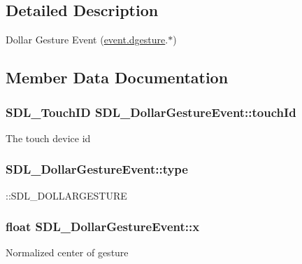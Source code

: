 \subsection{Detailed Description}
Dollar Gesture Event (\hyperlink{union_s_d_l___event_a4481167b9f8549aeb254e97ca812e74d}{event.\+dgesture}.$\ast$) 

\subsection{Member Data Documentation}
\hypertarget{struct_s_d_l___dollar_gesture_event_a40402f6911ed0dba48e6b23aa02bd83d}{}
\subsubsection[{touch\+Id}]{\setlength{\rightskip}{0pt plus 5cm}S\+D\+L\+\_\+\+Touch\+I\+D S\+D\+L\+\_\+\+Dollar\+Gesture\+Event\+::touch\+Id}\label{struct_s_d_l___dollar_gesture_event_a40402f6911ed0dba48e6b23aa02bd83d}
The touch device id \hypertarget{struct_s_d_l___dollar_gesture_event_ac7f6948754a1b2eb36edde043bf75ce9}{}
\subsubsection[{type}]{ S\+D\+L\+\_\+\+Dollar\+Gesture\+Event\+::type}\label{struct_s_d_l___dollar_gesture_event_ac7f6948754a1b2eb36edde043bf75ce9}
\+::\+S\+D\+L\+\_\+\+D\+O\+L\+L\+A\+R\+G\+E\+S\+T\+U\+R\+E \hypertarget{struct_s_d_l___dollar_gesture_event_a9888449bd8842ed96494b4db16a6097b}{}
\subsubsection[{x}]{\setlength{\rightskip}{0pt plus 5cm}float S\+D\+L\+\_\+\+Dollar\+Gesture\+Event\+::x}\label{struct_s_d_l___dollar_gesture_event_a9888449bd8842ed96494b4db16a6097b}
Normalized center of gesture \hypertarget{struct_s_d_l___dollar_gesture_event_a293b2303acc1cfc63c167c5525e6eab5}{}
